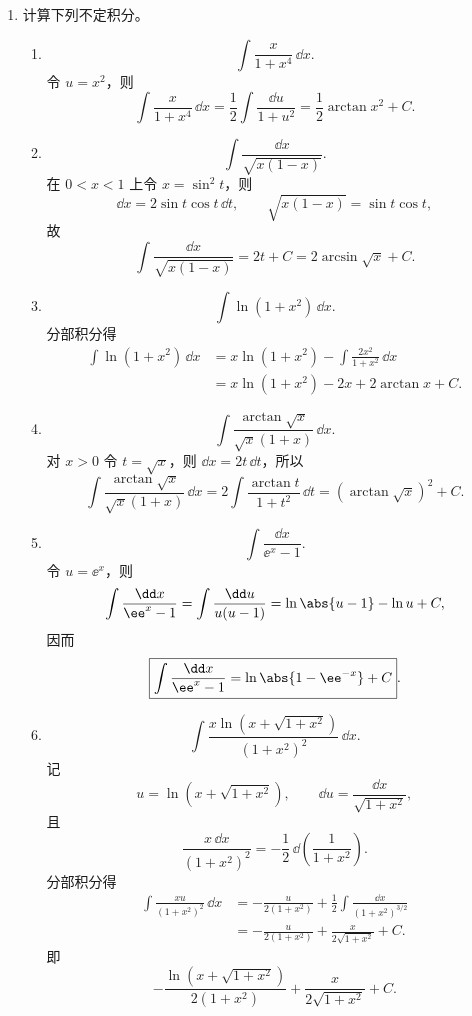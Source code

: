\begin{enumerate}
  \item 计算下列不定积分。
  \begin{enumerate}[label=(\arabic*)]
    \item
    \[
      \int\frac{x}{1+x^4}\,\dd x.
    \]
    令 $u=x^2$，则
    \[
      \int\frac{x}{1+x^4}\,\dd x
      =\frac12\int\frac{\dd u}{1+u^2}
      =\frac12\arctan x^2+C.
    \]

    \item
    \[
      \int\frac{\dd x}{\sqrt{x(1-x)}}.
    \]
    在 $0<x<1$ 上令 $x=\sin^2t$，则
    \[
      \dd x=2\sin t\cos t\,\dd t,
      \qquad
      \sqrt{x(1-x)}=\sin t\cos t,
    \]
    故
    \[
      \int\frac{\dd x}{\sqrt{x(1-x)}}
      =2t+C
      =2\arcsin\sqrt{x}+C.
    \]

    \item
    \[
      \int\ln(1+x^2)\,\dd x.
    \]
    分部积分得
    \begin{align*}
      \int\ln(1+x^2)\,\dd x
      &=x\ln(1+x^2)-\int\frac{2x^2}{1+x^2}\,\dd x\\
      &=x\ln(1+x^2)-2x+2\arctan x+C.
    \end{align*}

    \item
    \[
      \int\frac{\arctan\sqrt{x}}{\sqrt{x}(1+x)}\,\dd x.
    \]
    对 $x>0$ 令 $t=\sqrt{x}$，则 $\dd x=2t\,\dd t$，所以
    \[
      \int\frac{\arctan\sqrt{x}}{\sqrt{x}(1+x)}\,\dd x
      =2\int\frac{\arctan t}{1+t^2}\,\dd t
      =(\arctan\sqrt{x})^2+C.
    \]

    \item
    \[
      \int\frac{\dd x}{\ee^x-1}.
    \]
    令 $u=\ee^x$，则
    \[
      \int\frac{\dd x}{\ee^x-1}
      =\int\frac{\dd u}{u(u-1)}
      =\ln\abs{u-1}-\ln u+C,
    \]
    因而
    \[
      \boxed{\int\frac{\dd x}{\ee^x-1}=\ln\abs{1-\ee^{-x}}+C}.
    \]

    \item
    \[
      \int\frac{x\ln(x+\sqrt{1+x^2})}{(1+x^2)^2}\,\dd x.
    \]
    记
    \[
      u=\ln(x+\sqrt{1+x^2}),
      \qquad
      \dd u=\frac{\dd x}{\sqrt{1+x^2}},
    \]
    且
    \[
      \frac{x\,\dd x}{(1+x^2)^2}
      =-\frac12\,\dd\left(\frac1{1+x^2}\right).
    \]
    分部积分得
    \begin{align*}
      \int\frac{x u}{(1+x^2)^2}\,\dd x
      &=-\frac{u}{2(1+x^2)}
        +\frac12\int\frac{\dd x}{(1+x^2)^{3/2}}\\
      &=-\frac{u}{2(1+x^2)}+\frac{x}{2\sqrt{1+x^2}}+C.
    \end{align*}
    即
    \[
      \boxed{-\frac{\ln(x+\sqrt{1+x^2})}{2(1+x^2)}
      +\frac{x}{2\sqrt{1+x^2}}+C}.
    \]


\end{enumerate}
\end{enumerate}
